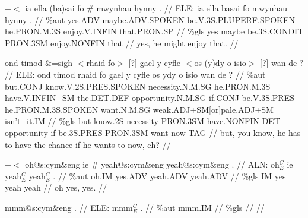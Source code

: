 \documentclass[a4paper,10pt]{article}
\begin{document}
\ex
\begingl[lingstyle=gergl]
\glchat +$<$ ia ella (ba)sai fo \# mwynhau hynny . //
\glsurface ELE:  ia ella basai fo mwynhau hynny .  //
\glauto \%aut  yes{\scriptsize .ADV} maybe{\scriptsize .ADV.SPOKEN} be{\scriptsize .V.3S.PLUPERF.SPOKEN} he{\scriptsize .PRON.M.3S} enjoy{\scriptsize .V.INFIN} that{\scriptsize .PRON.SP}   //
\glmanual \%gls  yes maybe be{\scriptsize .3S.CONDIT} PRON{\scriptsize .3SM} enjoy{\scriptsize .NONFIN} that   //
\gleng yes, he might enjoy that. //
\endgl
\xe

\ex
\begingl[lingstyle=gergl]
\glchat ond timod \&=sigh $<$rhaid fo$>$ [?] gael y cyfle $<$os (y)dy o isio$>$ [?] wan de ? //
\glsurface ELE:  ond timod rhaid fo gael y cyfle os ydy o isio wan de ?  //
\glauto \%aut  but{\scriptsize .CONJ} know{\scriptsize .V.2S.PRES.SPOKEN} necessity{\scriptsize .N.M.SG} he{\scriptsize .PRON.M.3S} have{\scriptsize .V.INFIN+SM} the{\scriptsize .DET.DEF} opportunity{\scriptsize .N.M.SG} if{\scriptsize .CONJ} be{\scriptsize .V.3S.PRES} he{\scriptsize .PRON.M.3S.SPOKEN} want{\scriptsize .N.M.SG} weak{\scriptsize .ADJ+SM[or]pale.ADJ+SM} isn't\_it{\scriptsize .IM}   //
\glmanual \%gls  but know{\scriptsize .2S} necessity PRON{\scriptsize .3SM} have{\scriptsize .NONFIN} DET opportunity if be{\scriptsize .3S.PRES} PRON{\scriptsize .3SM} want now TAG   //
\gleng but, you know, he has to have the chance if he wants to now, eh? //
\endgl
\xe

\ex
\begingl[lingstyle=gergl]
\glchat +$<$ oh@s:cym\&eng ie \# yeah@s:cym\&eng yeah@s:cym\&eng . //
\glsurface ALN:  oh$^{C}_{E}$ ie yeah$^{C}_{E}$ yeah$^{C}_{E}$ .  //
\glauto \%aut  oh{\scriptsize .IM} yes{\scriptsize .ADV} yeah{\scriptsize .ADV} yeah{\scriptsize .ADV}   //
\glmanual \%gls  IM yes yeah yeah   //
\gleng oh yes, yes. //
\endgl
\xe

\ex
\begingl[lingstyle=gergl]
\glchat mmm@s:cym\&eng . //
\glsurface ELE:  mmm$^{C}_{E}$ .  //
\glauto \%aut  mmm{\scriptsize .IM}   //
\glmanual \%gls     //
\gleng  //
\endgl
\xe
\end{document}
